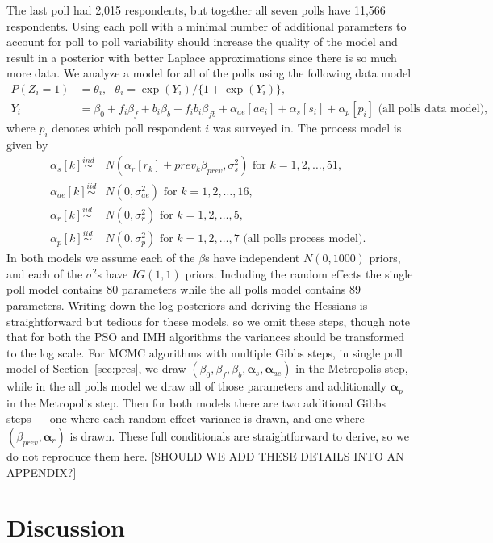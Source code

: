 \documentclass[12pt]{article}
\begin{document}
The last poll had 2,015 respondents, but together all seven polls have 11,566 respondents. Using each poll with a minimal number of additional parameters to account for poll to poll variability should increase the quality of the model and result in a posterior with better Laplace approximations since there is so much more data. We analyze a model for all of the polls using the following data model
\begin{align*}
P(Z_i = 1) &= \theta_i,\ \ \   \theta_i = \exp(Y_i)/\{1 + \exp(Y_i)\}, \\
Y_i &= \beta_0 + f_i\beta_f + b_i\beta_b + f_ib_i\beta_{fb} + \alpha_{ae}[ae_i] + \alpha_{s}[s_i] + \alpha_p[p_i]\mbox{\ \ \ \ (all polls data model), }
\end{align*}
where $p_i$ denotes which poll respondent $i$ was surveyed in. The process model is given by
\begin{align*}
\alpha_s[k] \stackrel{ind}{\sim}& N(\alpha_r[r_k] + prev_k\beta_{prev}, \sigma^2_s) \mbox{ for } k=1,2,\dots,51,\\
\alpha_{ae}[k] \stackrel{iid}{\sim}& N(0, \sigma^2_{ae}) \mbox{ for } k=1,2,\dots,16,\\
\alpha_{r}[k] \stackrel{iid}{\sim}& N(0, \sigma^2_{r}) \mbox{ for } k=1,2,\dots,5,\\
\alpha_{p}[k] \stackrel{iid}{\sim}& N(0, \sigma^2_{p}) \mbox{ for } k=1,2,\dots,7 \mbox{\ \ \ \ (all polls process model). }
\end{align*}
In both models we assume each of the $\beta$s have independent $N(0,1000)$ priors, and each of the
$\sigma^2$s have $IG(1,1)$ priors. Including the random effects the single poll model contains 80 parameters while the all polls model contains 89 parameters. Writing down the log posteriors and deriving the Hessians is straightforward but tedious for these models, so we omit these steps, though note that for both the PSO and IMH algorithms the variances should be transformed to the log scale. For MCMC algorithms with multiple Gibbs steps, in single poll model of Section~\ref{sec:pres}, we draw $(\beta_0, \beta_f, \beta_b, \bm{\alpha}_{s}, \bm{\alpha}_{ae})$ in the Metropolis step, while in the all polls model we draw all of those parameters and additionally $\bm{\alpha}_p$ in the Metropolis step. Then for both models there are two additional Gibbs steps --- one where each random effect variance is drawn, and one where $(\beta_{prev}, \bm{\alpha}_r)$ is drawn. These full conditionals are straightforward to derive, so we do not reproduce them here. [SHOULD WE ADD THESE DETAILS INTO AN APPENDIX?]


\section{Discussion}\label{sec:discuss}

\clearpage\pagebreak\newpage\thispagestyle{empty}


\end{document}
